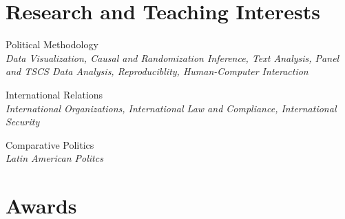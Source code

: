 \documentclass[margin, 10pt]{CVStyleTemplate}\usepackage[]{graphicx}\usepackage[dvipsnames]{xcolor}
\begin{document}
\begin{resume}



\section{Research and Teaching Interests}

Political Methodology\\
\emph{Data Visualization, Causal and Randomization Inference, Text Analysis, Panel and TSCS Data Analysis, Reproduciblity, Human-Computer Interaction}

International Relations\\
\emph{International Organizations, International Law and Compliance, International Security}

Comparative Politics\\
\emph{Latin American Politcs}

\section{Awards}%


\end{resume}
\end{document}
